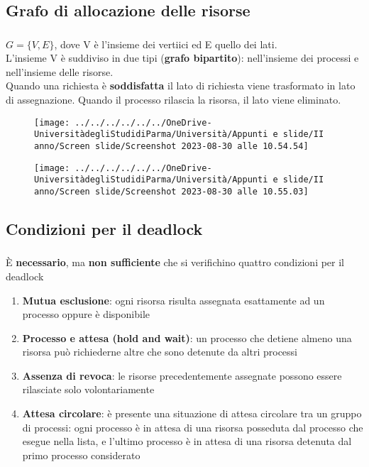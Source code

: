 \documentclass{beamer}
\newenvironment{mainframe}{
	\begin{frame}
		\frametitle{\insertsubsection}
		\framesubtitle{\insertsection}
	}{
	\end{frame}
}
\begin{document}
\subsection{Grafo di allocazione delle risorse}
\begin{mainframe}
	$G = \{V, E\}$, dove V è l'insieme dei vertiici ed E quello dei lati.\\
	L'insieme V è suddiviso in due tipi (\textbf{grafo bipartito}): nell'insieme dei processi e nell'insieme delle risorse.\\
	Quando una richiesta è \textbf{soddisfatta} il lato di richiesta viene trasformato in lato di assegnazione. Quando il processo rilascia la risorsa, il lato viene eliminato.
\end{mainframe}
\begin{frame}
	\begin{multicols}{2}
		\begin{figure}
			\centering
			\texttt{[image: ../../../../../../OneDrive-UniversitàdegliStudidiParma/Università/Appunti e slide/II anno/Screen slide/Screenshot 2023-08-30 alle 10.54.54]}
		\end{figure}
		\begin{figure}
			\centering
			\texttt{[image: ../../../../../../OneDrive-UniversitàdegliStudidiParma/Università/Appunti e slide/II anno/Screen slide/Screenshot 2023-08-30 alle 10.55.03]}
		\end{figure}
	\end{multicols}
\end{frame}
\subsection{Condizioni per il deadlock}
\begin{mainframe}
	È \textbf{necessario}, ma \textbf{non sufficiente} che si verifichino quattro condizioni per il deadlock
	\begin{enumerate}
		\item \textbf{Mutua esclusione}: ogni risorsa risulta assegnata esattamente ad un processo oppure è disponibile
		\item \textbf{Processo e attesa (hold and wait)}: un processo che detiene almeno una risorsa può richiederne altre che sono detenute da altri processi
		\item \textbf{Assenza di revoca}: le risorse precedentemente assegnate possono essere rilasciate solo volontariamente
		\item \textbf{Attesa circolare}: è presente una situazione di attesa circolare tra un gruppo di processi: ogni processo è in attesa di una risorsa posseduta dal processo che esegue nella lista, e l'ultimo processo è in attesa di una risorsa detenuta dal primo processo considerato
	\end{enumerate}
\end{mainframe}
\end{document}
